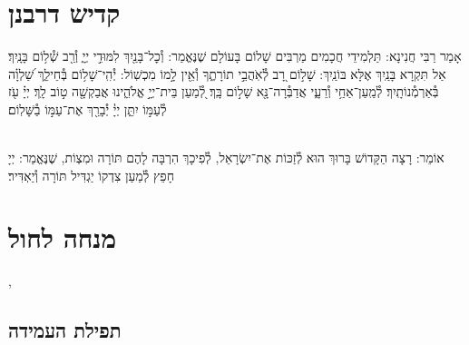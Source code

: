 \documentclass[twoside, openany, parskip=half, 11pt]{book}
\begin{document}
\tachanunim

\vfill


\sepline


\chapter[קדיש דרבנן]{ קדיש דרבנן }
\label{kaddish derabonan}


אָמַר רַבִּי חֲנִינָא: תַּלְמִידֵי חֲכָמִים מַרְבִּים שָׁלוֹם בָּעוֹלָם שֶׁנֶּאֱמַר: וְ֯כׇל־בָּנַ֖יִךְ לִמּוּדֵ֣י יְיָ֑ וְ֯רַ֖ב שְׁ֯ל֥וֹם בָּנָֽיִךְ׃ אַל תִּקְרָא בָּנַֽיִךְ אֶלָּא בּוֹנַֽיִךְ: שָׁל֣וֹם רָ֭ב לְ֯אֹֽהֲבֵ֣י תוֹרָתֶ֑ךָ וְ֯אֵ֖ין לָ֣מוֹ מִכְשֽׁוֹל: יְ֯הִֽי־שָׁל֥וֹם בְּ֯חֵילֵ֑ךְ שַׁ֝לְוָ֗ה בְּ֯אַרְמְ֯נוֹתָֽיִךְ׃ לְ֯מַֽעַן־אַחַ֥י וְ֯רֵעָ֑י אֲדַבְּ֯רָה־נָּ֖א שָׁל֣וֹם בָּֽךְ׃ לְ֭֯מַעַן בֵּית־יְיָ֣ אֱלֹהֵ֑ינוּ אֲבַקְשָׁ֖ה ט֣וֹב לָֽךְ׃ יְיָ֗ עֹ֖ז לְ֯עַמּ֣וֹ יִתֵּ֑ן יְיָ֓ יְ֯בָרֵ֖ךְ אֶת־עַמּ֣וֹ בַ֯שָּׁלֽוֹם׃

\\
אוֹמֵר: רָצָה הַקָּדוֹשׁ בָּרוּךְ הוּא לְ֯זַכּוֹת אֶת־יִשְׂרָאֵל, לְ֯פִיכָךְ הִרְבָּה לָהֶם תּוֹרָה וּמִצְוֹת, שֶׁנֶּאֱמַר:
יְיָ חָפֵץ לְ֯מַעַן צִדְקוֹ יַגְדִּיל תּוֹרָה וְ֯יַאְדִּיר׃


\begin{kaddish}

\rabbiskaddish
\end{kaddish}

\vfill
\sepline

\chapter[מנחה לחול]{ מנחה לחול }
\tamid
\ketoret
\sepline
\ashrei

\halfkaddish

,


\section*{ תפילת העמידה }
\end{document}
